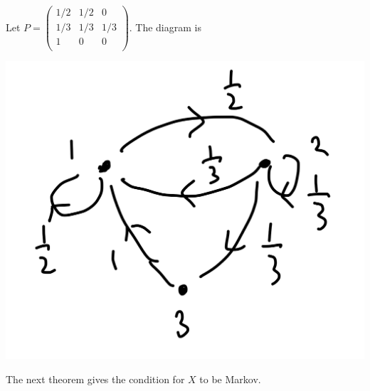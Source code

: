 \documentclass[a4paper]{article}
\begin{document}
\begin{example}
    Let $ P = \begin{pmatrix}
        1/2 & 1/2 & 0 \\
        1/3 & 1/3 & 1/3 \\
        1 & 0 & 0 \\
    \end{pmatrix} $. The diagram is
    \begin{center}
        \includegraphics[scale=0.09]{markov2.jpeg}
    \end{center}
\end{example}

The next theorem gives the condition for $X$ to be Markov.
\end{document}
